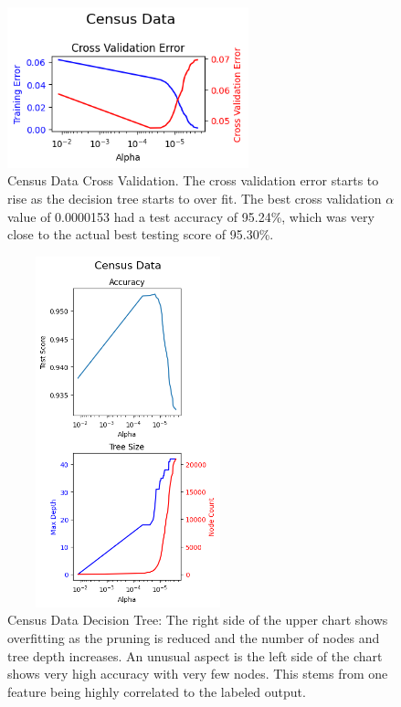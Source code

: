 \documentclass[letterpaper]{article} %
\begin{document}
\begin{figure}[htb]
\centering
\includegraphics[width=2.75in]{figures/Census_Data_decision_tree_cross_validation.png}
\caption{Census Data Cross Validation.  The cross validation error starts to rise as the decision tree starts to over fit.  The best cross validation $\alpha$ value of 0.0000153 had a test accuracy of 95.24\%, which was very close to the actual best testing score of 95.30\%. }
\label{fig:census_data_decision_tree_cross_validation}
\end{figure}

\begin{figure}[htb]
\centering
\includegraphics[width=2.75in, height=4in]{figures/Census_Data_decision_tree.png}
\caption{Census Data Decision Tree:  The right side of the upper chart shows overfitting as the pruning is reduced and the number of nodes and tree depth increases.  An unusual aspect is the left side of the chart shows very high accuracy with very few nodes.  This stems from one feature being highly correlated to the labeled output.}
\label{fig:census_data_decision_tree}
\end{figure}
\end{document}
